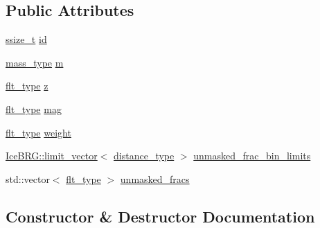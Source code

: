 \subsection*{Public Attributes}
\begin{DoxyCompactItemize}
\item 
\hyperlink{lib_2IceBRG__main_2common_8h_ab322a3e50421dc5f0c43316b1b373592}{ssize\+\_\+t} \hyperlink{structIceBRG_1_1lens__id_afd7ce5f12f3675c0c63e2b741c177652}{id}
\item 
\hyperlink{namespaceIceBRG_a1be72ac4918a9b029f2eefa084213e35}{mass\+\_\+type} \hyperlink{structIceBRG_1_1lens__id_af2551e9da4443bc56540c32dee75fbb5}{m}
\item 
\hyperlink{lib_2IceBRG__main_2common_8h_ad0f130a56eeb944d9ef2692ee881ecc4}{flt\+\_\+type} \hyperlink{structIceBRG_1_1lens__id_aedfbb8478463687a0aa5982105a9f8fc}{z}
\item 
\hyperlink{lib_2IceBRG__main_2common_8h_ad0f130a56eeb944d9ef2692ee881ecc4}{flt\+\_\+type} \hyperlink{structIceBRG_1_1lens__id_a9685ba64aac6b662881132968034d32a}{mag}
\item 
\hyperlink{lib_2IceBRG__main_2common_8h_ad0f130a56eeb944d9ef2692ee881ecc4}{flt\+\_\+type} \hyperlink{structIceBRG_1_1lens__id_ab1474c2d0c19469e6bb8c333b2123586}{weight}
\item 
\hyperlink{classIceBRG_1_1limit__vector}{Ice\+B\+R\+G\+::limit\+\_\+vector}$<$ \hyperlink{namespaceIceBRG_a45499647eb87e24c10ab32c628711cec}{distance\+\_\+type} $>$ \hyperlink{structIceBRG_1_1lens__id_a6a4f65e3e6e010a6d3ad0e27ba84ad9b}{unmasked\+\_\+frac\+\_\+bin\+\_\+limits}
\item 
std\+::vector$<$ \hyperlink{lib_2IceBRG__main_2common_8h_ad0f130a56eeb944d9ef2692ee881ecc4}{flt\+\_\+type} $>$ \hyperlink{structIceBRG_1_1lens__id_a9a3d312cb37f480aa07d94e5a39d714b}{unmasked\+\_\+fracs}
\end{DoxyCompactItemize}


\subsection{Constructor \& Destructor Documentation}
\hypertarget{structIceBRG_1_1lens__id_aae9828867a9d13f043820f9084661b00}{}
